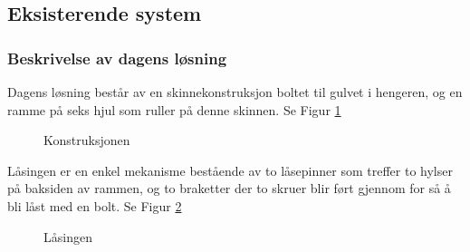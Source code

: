 \subsection{Eksisterende system}
\subsubsection{Beskrivelse av dagens løsning}

Dagens løsning består av en skinnekonstruksjon boltet til gulvet i hengeren, og en ramme på seks hjul som ruller på denne skinnen. Se Figur \ref{F1} 
\begin{figure}[H]
\centering   
{}
\caption{Konstruksjonen}
\label{F1}
\end{figure}

Låsingen er en enkel mekanisme bestående av to låsepinner som treffer to hylser på baksiden av rammen, og to braketter der to skruer blir ført gjennom for så å bli låst med en bolt. Se Figur \ref{F2} 

\begin{figure}[H]
\centering   
{}
\caption{Låsingen}
\label{F2}
\end{figure}

